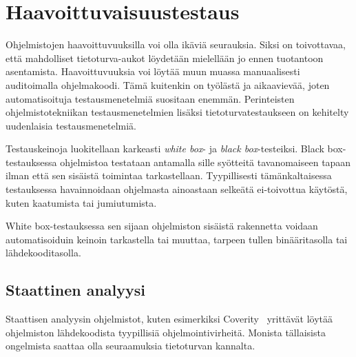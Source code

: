 \section{Haavoittuvaisuustestaus}

Ohjelmistojen haavoittuvuuksilla voi olla ikäviä seurauksia.
Siksi on toivottavaa, että mahdolliset tietoturva-aukot löydetään mielellään jo ennen tuotantoon asentamista.
Haavoittuvuuksia voi löytää muun muassa manuaalisesti auditoimalla ohjelmakoodi.
Tämä kuitenkin on työlästä ja aikaavievää, joten automatisoituja testausmenetelmiä suositaan enemmän.
Perinteisten ohjelmistotekniikan testausmenetelmien lisäksi tietoturvatestaukseen on kehitelty uudenlaisia testausmenetelmiä.

Testauskeinoja luokitellaan karkeasti \emph{white box}- ja \emph{black box}-testeiksi.
Black box-testauksessa ohjelmistoa testataan antamalla sille syötteitä tavanomaiseen tapaan ilman että sen sisäistä toimintaa tarkastellaan.
Tyypillisesti tämänkaltaisessa testauksessa havainnoidaan ohjelmasta ainoastaan selkeätä ei-toivottua käytöstä, kuten kaatumista tai jumiutumista.

White box-testauksessa sen sijaan ohjelmiston sisäistä rakennetta voidaan automatisoiduin keinoin
tarkastella tai muuttaa, tarpeen tullen binääritasolla tai lähdekooditasolla.

\subsection{Staattinen analyysi}

Staattisen analyysin ohjelmistot, kuten esimerkiksi Coverity~\cite{Coverity} yrittävät löytää ohjelmiston lähdekoodista tyypillisiä ohjelmointivirheitä.
Monista tällaisista ongelmista saattaa olla seuraamuksia tietoturvan kannalta.


